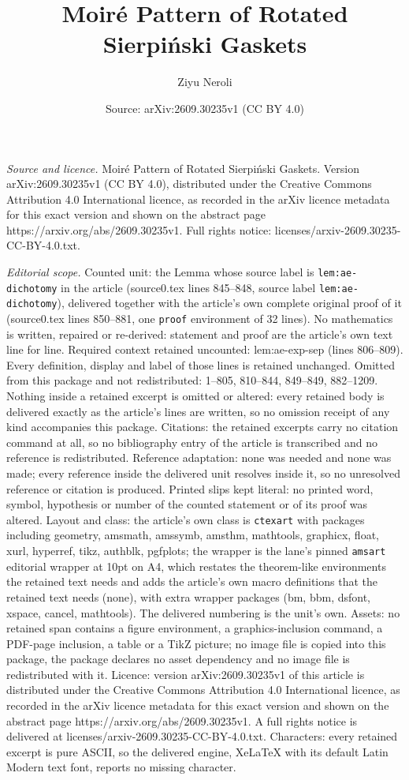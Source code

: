 \documentclass[10pt,a4paper]{amsart}
\title[Moir\'e Pattern of Rotated Sierpi\'nski Gaskets]{Moir\'e Pattern of Rotated Sierpi\'nski Gaskets}
\author{Ziyu Neroli}
\date{Source: arXiv:2609.30235v1 (CC BY 4.0)}
\begin{document}
\maketitle

\noindent\emph{Source and licence.} Moir\'e Pattern of Rotated Sierpi\'nski Gaskets. Version arXiv:2609.30235v1 (CC BY 4.0), distributed under the Creative Commons Attribution 4.0 International licence, as recorded in the arXiv licence metadata for this exact version and shown on the abstract page https://arxiv.org/abs/2609.30235v1. Full rights notice: licenses/arxiv-2609.30235-CC-BY-4.0.txt.\par\smallskip

\noindent\textit{Editorial scope.} Counted unit: the Lemma whose source label is \texttt{lem:ae-dichotomy} in the article (source0.tex lines 845--848, source label \texttt{lem:ae-dichotomy}), delivered together with the article's own complete original proof of it (source0.tex lines 850--881, one \texttt{proof} environment of 32 lines). No mathematics is written, repaired or re-derived: statement and proof are the article's own text line for line. Required context retained uncounted: lem:ae-exp-sep (lines 806--809). Every definition, display and label of those lines is retained unchanged. Omitted from this package and not redistributed: 1--805, 810--844, 849--849, 882--1209. Nothing inside a retained excerpt is omitted or altered: every retained body is delivered exactly as the article's lines are written, so no omission receipt of any kind accompanies this package. Citations: the retained excerpts carry no citation command at all, so no bibliography entry of the article is transcribed and no reference is redistributed. Reference adaptation: none was needed and none was made; every reference inside the delivered unit resolves inside it, so no unresolved reference or citation is produced. Printed slips kept literal: no printed word, symbol, hypothesis or number of the counted statement or of its proof was altered. Layout and class: the article's own class is \texttt{ctexart} with packages including geometry, amsmath, amssymb, amsthm, mathtools, graphicx, float, xurl, hyperref, tikz, authblk, pgfplots; the wrapper is the lane's pinned \texttt{amsart} editorial wrapper at 10pt on A4, which restates the theorem-like environments the retained text needs and adds the article's own macro definitions that the retained text needs (none), with extra wrapper packages (bm, bbm, dsfont, xspace, cancel, mathtools). The delivered numbering is the unit's own. Assets: no retained span contains a figure environment, a graphics-inclusion command, a PDF-page inclusion, a table or a TikZ picture; no image file is copied into this package, the package declares no asset dependency and no image file is redistributed with it. Licence: version arXiv:2609.30235v1 of this article is distributed under the Creative Commons Attribution 4.0 International licence, as recorded in the arXiv licence metadata for this exact version and shown on the abstract page https://arxiv.org/abs/2609.30235v1. A full rights notice is delivered at licenses/arxiv-2609.30235-CC-BY-4.0.txt. Characters: every retained excerpt is pure ASCII, so the delivered engine, XeLaTeX with its default Latin Modern text font, reports no missing character.
\end{document}
